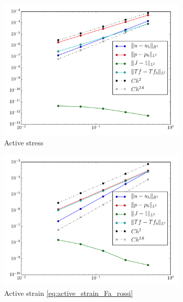 \documentclass[a4paper,10pt]{article}
\begin{document}
\begin{figure}[htbp]
\centering
\begin{subfigure}[t]{0.3\textwidth}
     \centering
     \includegraphics[width=\textwidth]{figures/mms2d_active_stress}
     \caption{\label{fig:mms2d_active_stress}Active stress}
\end{subfigure}
\begin{subfigure}[t]{0.3\textwidth}
    \includegraphics[width=\textwidth]{figures/mms2d_active_strain_rossi}
    \caption{\label{fig:mms2d_active_stain_rossi}Active strain \eqref{eq:active_strain_Fa_rossi} }    
\end{subfigure}
\begin{subfigure}[t]{0.3\textwidth}

\end{subfigure}
\end{figure}
\end{document}
